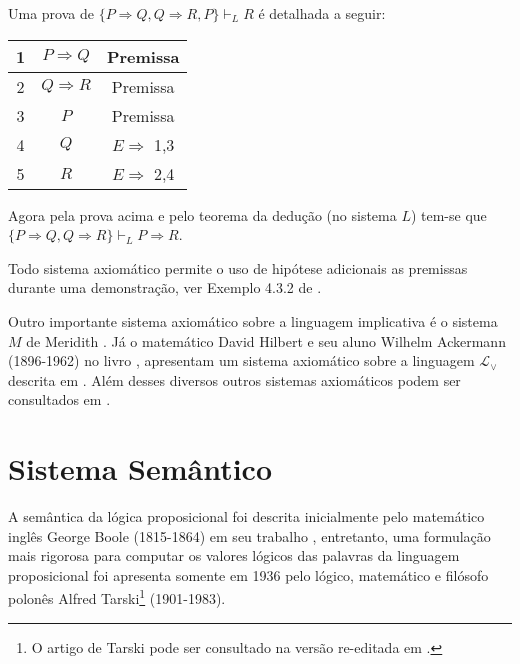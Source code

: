 \begin{exem}
    Uma prova de $\{P \Rightarrow Q, Q \Rightarrow R, P\} \vdash_L R$ é detalhada a seguir:
    \begin{table*}[ht]
        \centering
        \begin{tabular}{|c|c|c|}
            \hline
            1 & $P \Rightarrow Q$ & Premissa \\
            \hline
            2 & $Q \Rightarrow R$ & Premissa \\
            \hline
            3 & $P$ & Premissa \\
            \hline
            4 & $Q$ & $E\Rightarrow$ 1,3 \\
            \hline
            5 & $R$ & $E\Rightarrow$ 2,4 \\
            \hline
        \end{tabular}
    \end{table*}
    
    Agora pela prova acima e pelo teorema da dedução (no sistema $L$) tem-se que $\{P \Rightarrow Q, Q \Rightarrow R\} \vdash_L P \Rightarrow R$.
\end{exem}

\begin{rema}
    Todo sistema axiomático permite o uso de hipótese adicionais as premissas durante uma demonstração, ver Exemplo 4.3.2 de \cite{BenjaV1}.
\end{rema}

Outro importante sistema axiomático sobre a linguagem implicativa é o sistema $M$ de Meridith \cite{meredith1954}. Já o matemático David Hilbert e seu aluno Wilhelm Ackermann (1896-1962) no livro \cite{hilbert1999}, apresentam um sistema axiomático sobre a linguagem $\mathcal{L}_\lor$ descrita em \cite{BenjaV1}. Além desses diversos outros sistemas axiomáticos podem ser consultados em \cite{BenjaV1}.

\section{Sistema Semântico}\label{sec:SistemaSemantico}

A semântica da lógica proposicional foi descrita inicialmente pelo matemático inglês George Boole (1815-1864) em seu trabalho \cite{boole1854, boole1957}, entretanto, uma formulação mais rigorosa para computar os valores lógicos das palavras da linguagem proposicional foi apresenta somente em 1936 pelo lógico, matemático e filósofo polonês Alfred Tarski\footnote{O artigo de Tarski pode ser consultado na versão re-editada em \cite{tarski1983}.} (1901-1983). 

